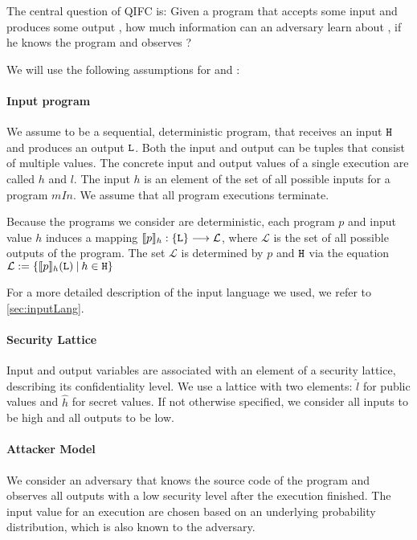 The central question of QIFC is: Given a program \p that accepts some input \In and produces some output \Out, how much information can an adversary \A learn about \In, if he knows the program \p and observes \Out?

We will use the following assumptions for \p and \A:

\paragraph{Input program}\label{p:input} We assume \p to be a sequential, deterministic program, that receives an input $\mathtt{H}$ and produces an output $\mathtt{L}$. Both the input and output can be tuples that consist of multiple values. The concrete input and output values of a single execution are called $h$ and $l$. The input $h$ is an element of the set of all possible inputs for a program $mIn$. We assume that all program executions terminate.

Because the programs we consider are deterministic, each program $p$ and input value $h$ induces a mapping $\llbracket p \rrbracket_h: \{\mathtt{L}\} \longrightarrow \mathcal{L}$, where $\mathcal{L}$ is the set of all possible outputs of the program. The set $\mathcal{L}$ is determined by $p$ and $\mathtt{H}$ via the equation $\mathcal{L} := \{\llbracket p \rrbracket_h(\mathtt{L}) \: | \: h \in \mathtt{H} \}$

For a  more detailed description of the input language we used, we refer to \ref{sec:inputLang}.

\paragraph{Security Lattice} Input and output variables are associated with an element of a security lattice, describing its confidentiality level. We use a lattice with two elements: $\hat{l}$ for public values and $\hat{h}$ for secret values. If not otherwise specified, we consider all inputs to be high and all outputs to be low.

\paragraph{Attacker Model} We consider an adversary \A that knows the source code of the program \p and observes all outputs with a low security level after the execution finished. The input value for an execution are chosen based on an underlying probability distribution, which is also known to the adversary.

